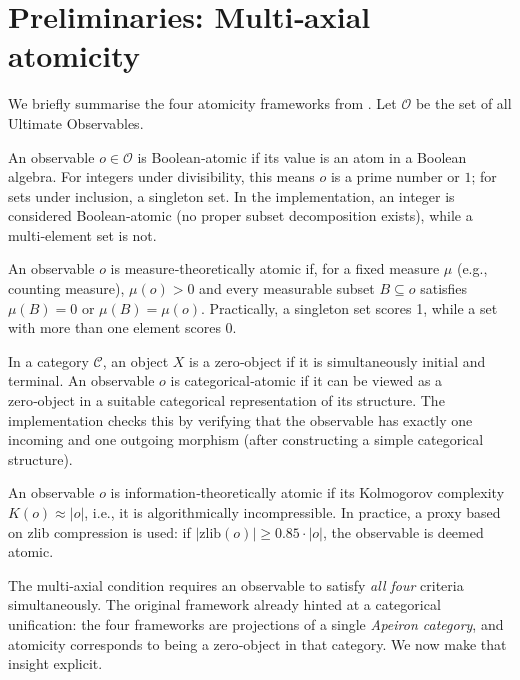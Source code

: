 \section{Preliminaries: Multi‑axial atomicity}\label{sec:prelim}
We briefly summarise the four atomicity frameworks from \cite{Beniers2026Apeiron}.
Let $\mathcal{O}$ be the set of all Ultimate Observables.

\begin{definition}\label{def:bool_atom}
An observable $o\in\mathcal{O}$ is Boolean‑atomic if its value is an atom in a Boolean algebra.
For integers under divisibility, this means $o$ is a prime number or $1$; for sets under inclusion, a singleton set.
In the implementation, an integer is considered Boolean‑atomic (no proper subset decomposition exists), while a multi‑element set is not.
\end{definition}

\begin{definition}\label{def:meas_atom}
An observable $o$ is measure‑theoretically atomic if, for a fixed measure $\mu$ (e.g., counting measure), $\mu(o)>0$ and every measurable subset $B\subseteq o$ satisfies $\mu(B)=0$ or $\mu(B)=\mu(o)$.
Practically, a singleton set scores 1, while a set with more than one element scores 0.
\end{definition}

\begin{definition}\label{def:cat_atom}
In a category $\mathcal{C}$, an object $X$ is a zero‑object if it is simultaneously initial and terminal.
An observable $o$ is categorical‑atomic if it can be viewed as a zero‑object in a suitable categorical representation of its structure.
The implementation checks this by verifying that the observable has exactly one incoming and one outgoing morphism (after constructing a simple categorical structure).
\end{definition}

\begin{definition}\label{def:info_atom}
An observable $o$ is information‑theoretically atomic if its Kolmogorov complexity $K(o)\approx |o|$, i.e., it is algorithmically incompressible.
In practice, a proxy based on zlib compression is used: if $|\mathrm{zlib}(o)|\ge 0.85\cdot|o|$, the observable is deemed atomic.
\end{definition}

The multi‑axial condition requires an observable to satisfy \emph{all four} criteria simultaneously.
The original framework \cite{Beniers2026Apeiron} already hinted at a categorical unification: the four frameworks are projections of a single \emph{Apeiron category}, and atomicity corresponds to being a zero‑object in that category.
We now make that insight explicit.